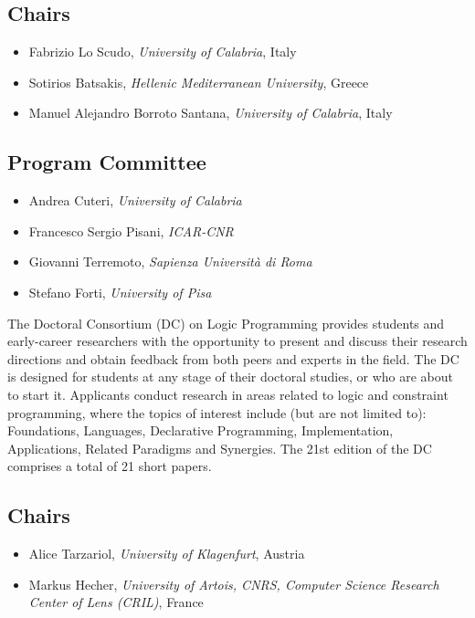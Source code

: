 \documentclass[
]{ceurart}
\begin{document}
\subsection*{Chairs}
\begin{itemize}
\item Fabrizio Lo Scudo, \emph{University of Calabria}, Italy

\item Sotirios Batsakis, \emph{Hellenic Mediterranean University}, Greece

\item Manuel Alejandro Borroto Santana, \emph{University of Calabria}, Italy
\end{itemize}

\subsection*{Program Committee}
\begin{itemize}
  \item Andrea Cuteri, \emph{University of Calabria}
  \item Francesco Sergio Pisani, \emph{ICAR-CNR}
  \item Giovanni Terremoto, \emph{Sapienza Università di Roma}
  \item Stefano Forti, \emph{University of Pisa}
\end{itemize}



\noindent
The Doctoral Consortium (DC) on Logic Programming provides students and early-career researchers with the opportunity to present and discuss their research directions and obtain feedback from both peers and experts in the field.
The DC is designed for students at any stage of their doctoral studies, or who are about to start it. 
Applicants conduct research in areas related to logic and constraint programming, where the topics of interest include (but are not limited to): Foundations, Languages, Declarative Programming, Implementation, Applications, Related Paradigms and Synergies.
The 21st edition of the DC comprises a total of 21 short papers.

\subsection*{Chairs}
\begin{itemize}
\item Alice Tarzariol, \emph{University of Klagenfurt}, Austria

\item Markus Hecher, \emph{University of Artois, CNRS, Computer Science Research Center of Lens (CRIL)}, France
\end{itemize}
\end{document}
